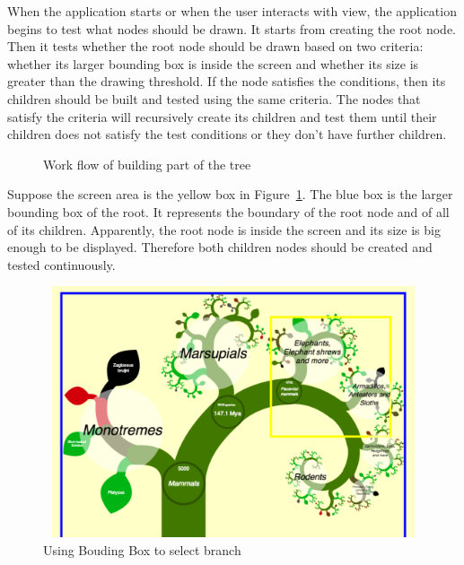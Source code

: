 \documentclass[MSc]{icldt}
\begin{document}
When the application starts or when the user interacts with view, the application begins to test what nodes should be drawn. It starts from creating the root node. Then it tests whether the root node should be drawn based on two criteria: whether its larger bounding box is inside the screen and whether its size is greater than the drawing threshold. If the node satisfies the conditions, then its children should be built and tested using the same criteria. The nodes that satisfy the criteria will recursively create its children and test them until their children does not satisfy the test conditions or they don't have further children. 

\begin{figure} [H]
\caption{Work flow of building part of the tree}
\end{figure}

Suppose the screen area is the yellow box in Figure~\ref{fig:screenAndBounding1}. The blue box is the larger bounding box of the root. It represents the boundary of the root node and of all of its children. Apparently, the root node is inside the screen and its size is big enough to be displayed. Therefore both children nodes should be created and tested continuously.

\begin{figure}[H]
  \centering
  \includegraphics [width=12.5cm,height=7.4cm]{ScreenAndBounding1}
  \caption{Using Bouding Box to select branch}
  \label{fig:screenAndBounding1}
\end{figure}
\end{document}

